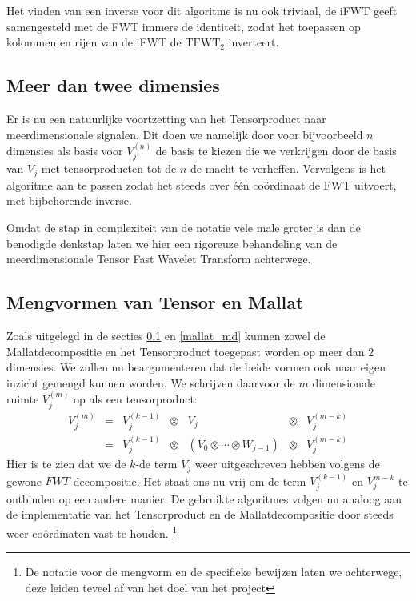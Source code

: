 Het vinden van een inverse voor dit algoritme is nu ook triviaal, de iFWT geeft samengesteld met de FWT
immers de identiteit, zodat het toepassen op kolommen en rijen van de iFWT de $\mathrm{TFWT}_2$ inverteert.

\subsection{Meer dan twee dimensies}
\label{tensor_md}
Er is nu een natuurlijke voortzetting van het Tensorproduct naar meerdimensionale signalen.
Dit doen we namelijk door voor bijvoorbeeld $n$ dimensies als basis voor $V^{(n)}_j$ de basis te kiezen die we verkrijgen 
door de basis van $V_j$ met tensorproducten tot de $n$-de macht te verheffen.
Vervolgens is het algoritme aan te passen zodat het steeds over \'e\'en co\"ordinaat de FWT uitvoert, 
met bijbehorende inverse.

Omdat de stap in complexiteit van de notatie vele male groter is dan de benodigde denkstap laten we hier een rigoreuze
behandeling van de meerdimensionale Tensor Fast Wavelet Transform achterwege.

\subsection{Mengvormen van Tensor en Mallat}
Zoals uitgelegd in de secties \ref{tensor_md} en \ref{mallat_md} kunnen zowel de Mallatdecompositie en 
het Tensorproduct toegepast worden op meer dan $2$ dimensies. We zullen nu beargumenteren dat de beide
vormen ook naar eigen inzicht gemengd kunnen worden. We schrijven daarvoor de $m$ dimensionale 
ruimte $V_j^{(m)}$ op als een tensorproduct:
\begin{equation*}
\begin{array}{ccccccc}
  V_j^{(m)} &=& V_j^{(k-1)} &\otimes&              V_j                     &\otimes& V_j^{(m-k)} \\
            &=& V_j^{(k-1)} &\otimes& (V_0 \otimes \cdots \otimes W_{j-1}) &\otimes& V_j^{(m-k)}
\end{array}
\end{equation*}
Hier is te zien dat we de $k$-de term $V_j$ weer uitgeschreven hebben volgens de gewone $FWT$
decompositie. Het staat ons nu vrij om de term $V_j^{(k-1)}$ en $V_j^{m-k}$ te ontbinden
op een andere manier. De gebruikte algoritmes volgen nu analoog aan de implementatie van het Tensorproduct
en de Mallatdecompositie door steeds weer co\"ordinaten vast te houden.
\footnote{De notatie voor de mengvorm en de specifieke bewijzen laten we achterwege, deze leiden teveel af van het
doel van het project }

